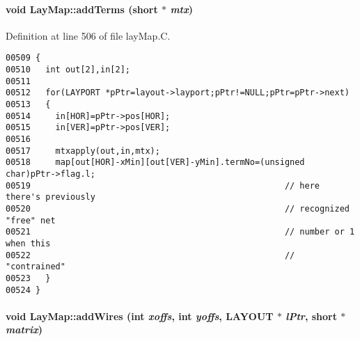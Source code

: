 \paragraph{\setlength{\rightskip}{0pt plus 5cm}void Lay\-Map::add\-Terms (short $\ast$ {\em mtx})\hspace{0.3cm}{\tt  [private]}}\hfill



Definition at line 506 of file lay\-Map.C.\small\begin{verbatim}00509 {
00510   int out[2],in[2];
00511   
00512   for(LAYPORT *pPtr=layout->layport;pPtr!=NULL;pPtr=pPtr->next)
00513   {
00514     in[HOR]=pPtr->pos[HOR];
00515     in[VER]=pPtr->pos[VER];
00516 
00517     mtxapply(out,in,mtx);
00518     map[out[HOR]-xMin][out[VER]-yMin].termNo=(unsigned char)pPtr->flag.l;  
00519                                                   // here there's previously
00520                                                   // recognized "free" net
00521                                                   // number or 1 when this
00522                                                   // "contrained"
00523   }
00524 }
\end{verbatim}\normalsize 
\label{LayMap_c2}
\paragraph{\setlength{\rightskip}{0pt plus 5cm}void Lay\-Map::add\-Wires (int {\em xoffs}, int {\em yoffs}, LAYOUT $\ast$ {\em l\-Ptr}, short $\ast$ {\em matrix})\hspace{0.3cm}{\tt  [private]}}\hfill



